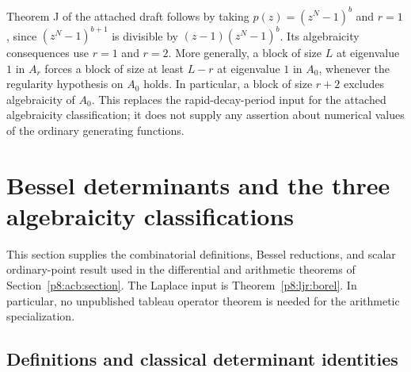 \documentclass[11pt,a4paper]{article}
\theoremstyle{definition}
\theoremstyle{remark}
\numberwithin{equation}{section}
\begin{document}
Theorem J of the attached draft follows by taking
$p(z)=(z^N-1)^b$ and $r=1$, since
$(z^N-1)^{b+1}$ is divisible by $(z-1)(z^N-1)^b$.
Its algebraicity consequences use $r=1$ and $r=2$.
More generally, a block of size $L$ at eigenvalue $1$ in $A_r$
forces a block of size at least $L-r$ at eigenvalue $1$ in $A_0$, whenever the
regularity hypothesis on $A_0$ holds.  In particular, a block
of size $r+2$ excludes algebraicity of $A_0$.
This replaces the rapid-decay-period input for the attached
algebraicity classification; it does not supply any assertion
about numerical values of the ordinary generating functions.


\clearpage

\section{Bessel determinants and the three algebraicity classifications}
\label{p8:sfb:section}

This section supplies the combinatorial definitions, Bessel reductions,
and scalar ordinary-point result used in the differential and arithmetic
theorems of Section~\ref{p8:acb:section}.  The Laplace input is
Theorem~\ref{p8:ljr:borel}.  In particular, no unpublished tableau
operator theorem is needed for the arithmetic specialization.

\subsection{Definitions and classical determinant identities}
\end{document}
